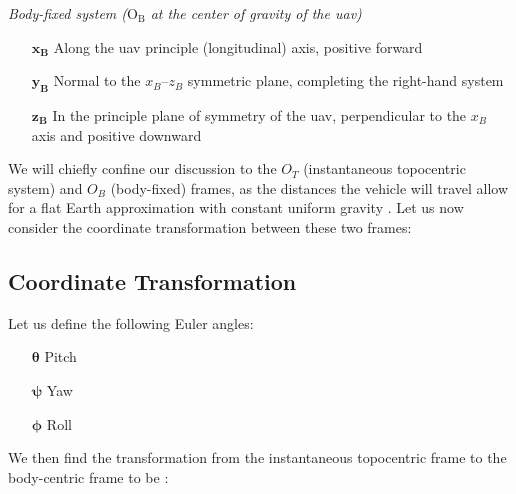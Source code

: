 \textit{Body-fixed system ($\text{O}_\text{B}$ at the center of gravity of the \gls{uav})}

\begin{itemize}[noitemsep]
	\item[$\mathbf{x_B}$] Along the \gls{uav} principle (longitudinal) axis, positive forward
	\item[$\mathbf{y_B}$] Normal to the $x_B$--$z_B$ symmetric plane, completing the right-hand system
	\item[$\mathbf{z_B}$] In the principle plane of symmetry of the \gls{uav}, perpendicular to the $x_B$ axis and positive downward
\end{itemize}

We will chiefly confine our discussion to the $O_T$ (instantaneous topocentric system) and $O_B$ (body-fixed) frames, as the distances the vehicle will travel allow for a flat Earth approximation with constant uniform gravity \citep{Burko2005}. Let us now consider the coordinate transformation between these two frames:

\subsection{Coordinate Transformation}

Let us define the following Euler angles:

\begin{itemize}[noitemsep]
	\item[$\boldsymbol{\theta}$] Pitch
	\item[$\boldsymbol{\psi}$] Yaw
	\item[$\boldsymbol{\phi}$] Roll
\end{itemize}

We then find the transformation from the instantaneous topocentric frame to the body-centric frame to be \citep[Eq.~2-2]{Kurak2018}:

